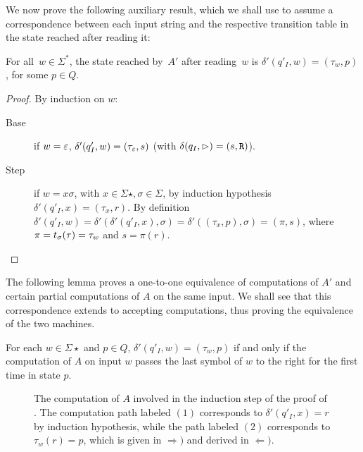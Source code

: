 We now prove the following auxiliary result, which we shall use to assume a correspondence between each input string and the respective transition table in the state reached after reading it:
\begin{lemm}
	For all~$w \in \Sigma^*$, the state reached by~$A'$ after reading~$w$ is $\delta'(q'_I,w) = (\tau_w,p)$, for some $p\in Q$.
\end{lemm}
\begin{proof}
	By induction on $w$:
	\begin{description}
		\item[Base] if $w=\varepsilon$, $\delta'(q'_I,w)=(\tau_\varepsilon,s)$ (with $\delta(q_I,\rhd)=(s,\mathtt R)$).
		\item[Step] if $w=x\sigma$, with $x\in\Sigma\star,\sigma\in\Sigma$, by induction hypothesis $\delta'(q'_I,x)=(\tau_x,r)$.
		      By definition $\delta'(q'_I,w)=\delta'(\delta'(q'_I,x),\sigma)=\delta'((\tau_x,p),\sigma)=(\pi,s)$, where $\pi=t_\sigma(\tau)=\tau_w$ and $s=\pi(r)$. \qedhere
	\end{description}
\end{proof}

The following lemma proves a one-to-one equivalence of computations of $A'$ and certain partial computations of $A$ on the same input. We shall see that this correspondence extends to accepting computations, thus proving the equivalence of the two machines.
\begin{lemm}\label{lem:transtab2DFA}
	For each $w\in\Sigma\star$ and $p\in Q$, $\delta'(q'_I,w)=(\tau_w,p)$ if and only if the computation of $A$ on input $w$ passes the last symbol of $w$ to the right for the first time in state $p$.
\end{lemm}


\begin{figure}
	\centering
	
	\caption[Induction step of the proof of ]{The computation of $A$ involved in the induction step of the proof of .
		The computation path labeled $(1)$ corresponds to $\delta'(q'_I,x)=r$ by induction hypothesis, while the path labeled $(2)$ corresponds to $\tau_w(r)=p$, which is given in $\Rightarrow)$ and derived in $\Leftarrow)$.}
	\label{fig:transtabproof}
\end{figure}

